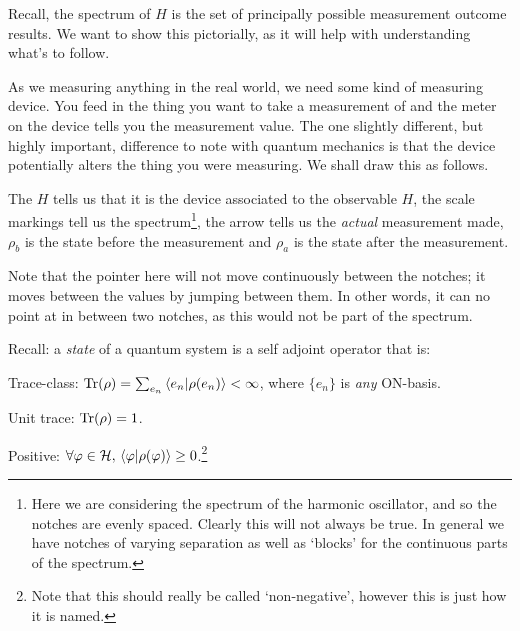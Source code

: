 Recall, the spectrum of $H$ is the set of principally possible measurement outcome results. We want to show this pictorially, as it will help with understanding what's to follow. 

As we measuring anything in the real world, we need some kind of measuring device. You feed in the thing you want to take a measurement of and the meter on the device tells you the measurement value. The one slightly different, but highly important, difference to note with quantum mechanics is that the device potentially alters the thing you were measuring. We shall draw this as follows. 

\begin{center}
\end{center}

The $H$ tells us that it is the device associated to the observable $H$, the scale markings tell us the spectrum\footnote{Here we are considering the spectrum of the harmonic oscillator, and so the notches are evenly spaced. Clearly this will not always be true. In general we have notches of varying separation as well as `blocks' for the continuous parts of the spectrum.}, the arrow tells us the \emph{actual} measurement made, $\rho_b$ is the state before the measurement and $\rho_a$ is the state after the measurement. 

\br 
Note that the pointer here will not move continuously between the notches; it moves between the values by jumping between them. In other words, it can no point at in between two notches, as this would not be part of the spectrum. 
\er 

Recall: a \emph{state} of a quantum system is a self adjoint operator that is:
\ben[label=(\roman*)]
\item Trace-class: $\Tr(\rho)=\sum_{e_n}\braket{e_n}{\rho(e_n)} <\infty$, where $\{e_n\}$ is \emph{any} ON-basis. 
\item Unit trace: $\Tr(\rho)=1$. 
\item Positive: $\forall\varphi\in\mathcal{H}, \, \braket{\varphi}{\rho(\varphi)}\geq 0$.\footnote{Note that this should really be called `non-negative', however this is just how it is named.}
\een 

